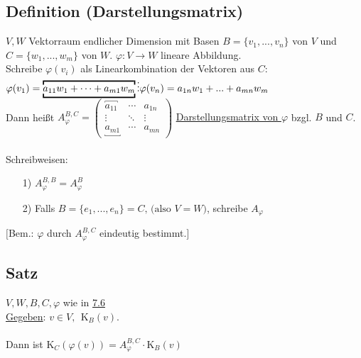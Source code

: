 \documentclass[12pt,titlepage, pdf]{article}
\newcommand{\uline}[1]{\underline{#1}}
\renewcommand{\>}{\rightarrow}
\renewcommand{\*}{\cdot}
\renewcommand{\phi}{\varphi}
\begin{document}
		      				\subsection{Definition (Darstellungsmatrix)}
		      				\label{7.6}
		      				$V,W$ Vektorraum endlicher Dimension mit Basen $B = \{v_1,...,v_n\}$ von $V$ und $C = \{w_1,...,w_m\}$ von $W$. $\phi: V \rightarrow W$ lineare Abbildung.\\
		      				Schreibe $\phi(v_i)$ als Linearkombination der Vektoren aus $C$:\\
		      				$\phi(v_1) = \overbracket{\underbracket{a_{11}w_1 + \cdots + a_{m1} w_m}} \\
		      				\vdots \\
		      				\phi(v_n) = a_{1n} w_1 + ... + a_{mn} w_m$\\
		      				Dann heißt $A_\phi^{B,C} = \begin{pmatrix}
		      				\overbracket{a_{11}} & \cdots & a_{1n} \\
		      				\vdots & \ddots & \vdots \\
		      				\underbracket{a_{m1}} & \cdots & a_{mn}
		      				\end{pmatrix}$ \uline{Darstellungsmatrix von $\phi$} bzgl. $B$ und $C$.\\
		      				\\
		      				Schreibweisen:
		      				\begin{itemize}
		      					\item[1)] $A_\phi^{B,B} = A_\phi^B$
		      					\item[2)] Falls $B = \{e_1,...,e_n\} = C \textrm{, (also }V = W)$, schreibe $A_\phi$
		      				\end{itemize}
		      				$\Bigg[$Bem.: $\phi$ durch $A_\phi^{B,C}$ eindeutig bestimmt.$\Bigg]$
		      				\subsection{Satz}
		      				\label{7.7}
		      				$V,W,B,C,\phi$ wie in \hyperref[7.6]{7.6}\\
		      				\uline{Gegeben}: $v \in V,~~ \text{K}_B(v)$.\\
		      				\\
		      				Dann ist K$_C(\phi(v)) = A_\phi^{B,C} \cdot \text{K}_B(v)$
\end{document}
